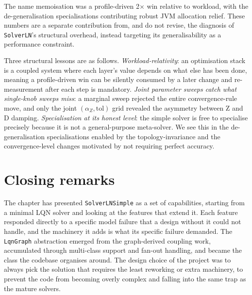 The name memoisation was a profile-driven 2$\times$ win relative to workload, with the de-generalisation specialisations contributing robust JVM allocation relief. These numbers are a separate contribution from, and do not revise, the diagnosis of \texttt{SolverLN}'s structural overhead, instead targeting its generalisability as a performance constraint.

Three structural lessons are as follows. \emph{Workload-relativity}: an optimisation stack is a coupled system where each layer's value depends on what else has been done, meaning a profile-driven win can be silently consumed by a later change and re-measurement after each step is mandatory. \emph{Joint parameter sweeps catch what single-knob sweeps miss}: a marginal sweep rejected the entire convergence-rule move, and only the joint $(\alpha_Z, \text{tol})$ grid revealed the asymmetry between Z and D damping. \emph{Specialisation at its honest level}: the simple solver is free to specialise precisely because it is not a general-purpose meta-solver. We see this in the de-generalisation specialisations enabled by the topology-invariance and the convergence-level changes motivated by not requiring perfect accuracy.




\section{Closing remarks}
\label{sec:contrib-closing}

The chapter has presented \texttt{SolverLNSimple} as a set of capabilities, starting from a minimal LQN solver and looking at the features that extend it. Each feature responded directly to a specific model failure that a design without it could not handle, and the machinery it adds is what its specific failure demanded. The \texttt{LqnGraph} abstraction emerged from the graph-derived coupling work, accumulated through multi-class support and fan-out handling, and became the class the codebase organises around. The design choice of the project was to always pick the solution that requires the least reworking or extra machinery, to prevent the code from becoming overly complex and falling into the same trap as the mature solvers.

